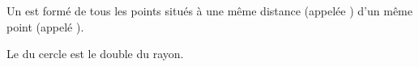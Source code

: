Un  est formé de tous les points situés à une même distance (appelée
) d'un même point (appelé ).\par\noindent
Le  du cercle est le double du rayon.
